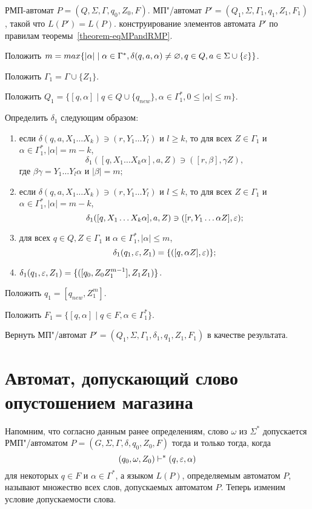 {\label{algo-RMPtoMP} РМП-автомат $P = (Q, \Sigma, \Gamma, q_0, Z_0, F)$. }
{МП"/автомат $P' = (Q_1, \Sigma, \Gamma_1, q_1, Z_1, F_1)$, такой что $L(P') = L(P).$}
{ конструирование элементов автомата $P'$ по правилам теоремы~\ref{theorem-eqMPandRMP}.}
{
\item Положить $m = max \{|\alpha| \mid \alpha \in \Gamma^*, \delta(q, a, \alpha) \neq \varnothing, q \in Q, a \in \Sigma \cup \{\varepsilon\}\}$.

\item Положить $\Gamma_1 = \Gamma \cup \{Z_1\}$.

\item Положить $Q_1 = \{ [q, \alpha] \mid q \in Q \cup \{ q_{new} \}, \alpha \in \Gamma_1^*, 0 \leq|\alpha| \leq m \}$.

\item Определить $\delta_1$ следующим образом:
	\begin{enumerate}
		\item если $\delta(q, a, X_1 \ldots X_k) \ni (r, Y_1 \ldots Y_l)$ и $l \geq k$, то для всех $Z \in \Gamma_1$ и $\alpha \in \Gamma_1^*, |\alpha| = m - k$,
		\[
			\delta_1([q, X_1 \ldots X_k\alpha], a, Z) \ni ([r, \beta], \gamma Z),
		\]
		где $\beta\gamma = Y_1\ldots Y_l\alpha$ и $|\beta| = m $;
		\item если $\delta(q, a, X_1 \ldots X_k) \ni (r, Y_1 \ldots Y_l)$ и $l \le k$, то для всех $Z \in \Gamma_1$ и $\alpha \in \Gamma_1^*, |\alpha| = m - k$,
		\[
			\delta_1([q, X_1 \ldots X_k\alpha], a, Z) \ni ([r, Y_1 \ldots \alpha Z], \varepsilon);
		\]
		\item для всех $q \in Q, Z \in \Gamma_1$ и $\alpha \in \Gamma_1^*, |\alpha| \le m$,
		\[
			\delta_1(q_1, \varepsilon, Z_1) = \{ ([q, \alpha Z], \varepsilon) \};
		\]
		\item $\delta_1(q_1, \varepsilon, Z_1) = \{ ([q_0, Z_0Z_1^{m-1}], Z_1Z_1) \}$.
  \end{enumerate}  
\item Положить $q_1 = [q_{new}, Z_1^m]$.

\item Положить $F_1 = \{ [q, \alpha] \mid q \in F, \alpha \in \Gamma_1^* \}$.

\item Вернуть МП"/автомат $P' = (Q_1, \Sigma, \Gamma_1, \delta_1, q_1, Z_1, F_1)$ в качестве результата.
} 

\section{Автомат, допускающий слово опустошением магазина }
\label{MPeps-fsm}
Напомним, что согласно данным ранее определениям, слово $\omega$ из
$\Sigma^*$ допускается РМП"/автоматом $P=
(G,\Sigma,\Gamma,\delta,q_0,Z_0,F)$ тогда и только тогда, когда
\[
(q_0,\omega,Z_0)\vdash^*(q,\varepsilon,\alpha)
\]
для некоторых $q\in F$ и
$\alpha\in\Gamma^*$, а языком $L(P)$, определяемым автоматом $P$,
называют множество всех слов, допускаемых автоматом $P$. Теперь изменим условие допускаемости слова.

